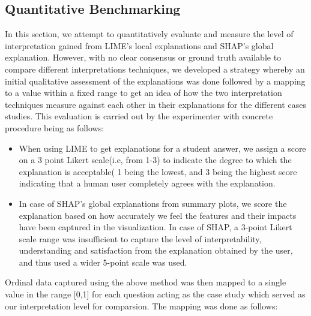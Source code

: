 \documentclass[letterpaper, 10 pt, conference]{ieeeconf}  %
\begin{document}
\subsection{Quantitative Benchmarking}
In this section, we attempt to quantitatively evaluate and measure the level of interpretation gained from LIME's local explanations and SHAP's global explanation. However, with no clear consensus or ground truth available to compare different interpretations techniques, we developed a strategy whereby an initial qualitative assessment of the explanations was done followed by a mapping to a value within a fixed range  to get an idea of how the two interpretation techniques measure against each other in their explanations for the different cases studies. This evaluation is carried out by the experimenter with concrete procedure being as follows:
\begin{itemize}
\item When using LIME to get explanations for a student answer, we assign a score on a 3 point Likert scale(i.e, from 1-3) to indicate the degree to which the explanation is acceptable( 1 being the lowest, and 3 being the highest score indicating that a human user completely agrees with the explanation.
\item In case of SHAP's global explanations from summary plots, we score the explanation based on how accurately we feel the features and their impacts have been captured in the visualization. In case of SHAP, a 3-point Likert scale range was insufficient to capture the level of interpretability, understanding and satisfaction from the explanation obtained by the user, and thus used a wider 5-point scale was used.
\end{itemize}
Ordinal data captured using the above method was then mapped to a single value in the range [0,1] for each question acting as the case study which served as our interpretation level for comparsion. The mapping was done as follows:
\end{document}

